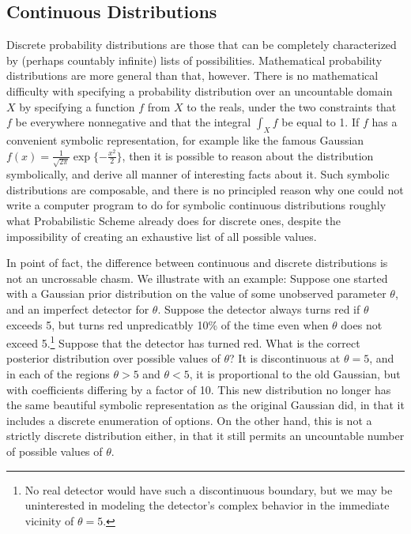 \documentclass[12pt]{article}
\begin{document}
\subsection{Continuous Distributions}
\label{continuous}

Discrete probability
distributions are those that can be completely characterized by
(perhaps countably infinite) lists of possibilities.  Mathematical
probability distributions are more general than that, however.  There
is no mathematical difficulty with specifying a probability
distribution over an uncountable domain $X$ by specifying a function
$f$ from $X$ to the reals, under the two constraints that $f$ be
everywhere nonnegative and that the integral $\int_X f$ be equal to 1.
If $f$ has a convenient symbolic representation, for example like the
famous Gaussian $f(x) = \frac{1}{\sqrt{2\pi}}\exp\{-\frac{x^2}{2}\}$, then
it is possible to reason about the distribution symbolically, and
derive all manner of interesting facts about it.  Such symbolic
distributions are composable, and there is no principled reason why
one could not write a computer program to do for symbolic continuous
distributions roughly what Probabilistic Scheme already does for
discrete ones, despite the impossibility of creating an exhaustive
list of all possible values.

In point of fact, the difference between continuous and discrete
distributions is not an uncrossable chasm.  We illustrate with an
example: Suppose one started with a Gaussian prior distribution on the
value of some unobserved parameter $\theta$, and an imperfect detector
for $\theta$.  Suppose the detector always turns red if $\theta$
exceeds 5, but turns red unpredicatbly 10\% of the time even when
$\theta$ does not exceed 5.\footnote{No real detector would have such
a discontinuous boundary, but we may be uninterested in modeling the
detector's complex behavior in the immediate vicinity of $\theta =
5$.}  Suppose that the detector has turned red.  What is the correct
posterior distribution over possible values of $\theta$?  It is
discontinuous at $\theta = 5$, and in each of the regions $\theta > 5$
and $\theta < 5$, it is proportional to the old Gaussian, but with
coefficients differing by a factor of 10.  This new distribution no
longer has the same beautiful symbolic representation as the original
Gaussian did, in that it includes a discrete enumeration of options.
On the other hand, this is not a strictly discrete distribution either,
in that it still permits an uncountable number of possible values of
$\theta$.
\end{document}
